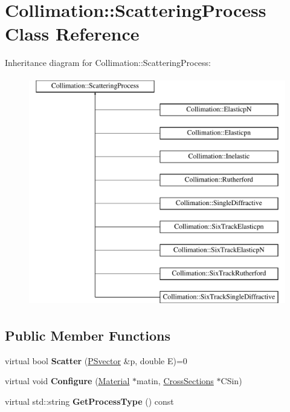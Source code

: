 \hypertarget{classCollimation_1_1ScatteringProcess}{}\section{Collimation\+:\+:Scattering\+Process Class Reference}
\label{classCollimation_1_1ScatteringProcess}
Inheritance diagram for Collimation\+:\+:Scattering\+Process\+:\begin{figure}[H]
\begin{center}
\leavevmode
\includegraphics[height=10.000000cm]{classCollimation_1_1ScatteringProcess}
\end{center}
\end{figure}
\subsection*{Public Member Functions}
\begin{DoxyCompactItemize}
\item 
\mbox{\label{classCollimation_1_1ScatteringProcess_afa1feb5bde093f5b72f64f09f86e1962}} 
virtual bool {\bfseries Scatter} (\hyperlink{classPSvector}{P\+Svector} \&p, double E)=0
\item 
\mbox{\label{classCollimation_1_1ScatteringProcess_a68416a3b9c16ce90a915f76f00f9c9d8}} 
virtual void {\bfseries Configure} (\hyperlink{classMaterial}{Material} $\ast$matin, \hyperlink{classCollimation_1_1CrossSections}{Cross\+Sections} $\ast$C\+Sin)
\item 
\mbox{\label{classCollimation_1_1ScatteringProcess_a91ba46066edd9f8ac7194e5275c9e3f5}} 
virtual std\+::string {\bfseries Get\+Process\+Type} () const
\end{DoxyCompactItemize}
